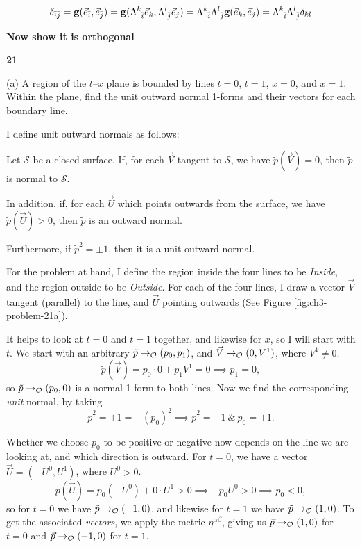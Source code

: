 \documentclass[gr-notes.tex]{subfiles}
\begin{document}
\begin{displaymath}
  \delta_{\bar{i}\bar{j}} =
  \vb{g}(\vec{e}_{\bar{i}}, \vec{e}_{\bar{j}}) =
  \vb{g}(\tensor{\Lambda}{^k_{\bar{i}}} \vec{e}_k,
         \tensor{\Lambda}{^l_{\bar{j}}} \vec{e}_j) =
  \tensor{\Lambda}{^k_{\bar{i}}}
  \tensor{\Lambda}{^l_{\bar{j}}}
  \vb{g}(\vec{e}_k, \vec{e}_j) =
  \tensor{\Lambda}{^k_{\bar{i}}}
  \tensor{\Lambda}{^l_{\bar{j}}}
  \delta_{kl}
\end{displaymath}

\textbf{Now show it is orthogonal}


\textbf{21}

(a) A region of the $t$--$x$ plane is bounded by lines $t=0$, $t=1$, $x=0$, and $x=1$. Within the plane, find the unit outward normal 1-forms and their vectors for each boundary line.

I define unit outward normals as follows:

Let $\mathcal{S}$ be a closed surface. If, for each $\vec{V}$ tangent to $\mathcal{S}$, we have $\tilde{p}(\vec{V}) = 0$, then $\tilde{p}$ is normal to $\mathcal{S}$.

In addition, if, for each $\vec{U}$ which points outwards from the surface, we have $\tilde{p}(\vec{U}) > 0$, then $\tilde{p}$ is an outward normal.

Furthermore, if $\tilde{p}^2 = \pm 1$, then it is a unit outward normal.

For the problem at hand, I define the region inside the four lines to be \emph{Inside}, and the region outside to be \emph{Outside}. For each of the four lines, I draw a vector $\vec{V}$ tangent (parallel) to the line, and $\vec{U}$ pointing outwards (See Figure \ref{fig:ch3-problem-21a}).

It helps to look at $t = 0$ and $t = 1$ together, and likewise for $x$, so I will start with $t$. We start with an arbitrary $\tilde{p} \to_{\mathcal{O}} (p_0, p_1)$, and $\vec{V} \to_{\mathcal{O}} (0, V^1)$, where $V^1 \neq 0$.
\begin{displaymath}
  \tilde{p}(\vec{V}) =
  p_0 \cdot 0 + p_1 V^1 = 0
  \implies
  p_1 = 0,
\end{displaymath}
so $\tilde{p} \to_{\mathcal{O}} (p_0, 0)$ is a normal 1-form to both lines. Now we find the corresponding \emph{unit} normal, by taking
\begin{displaymath}
  \tilde{p}^2 = \pm 1 = -(p_0)^2 \implies
  \tilde{p}^2 = -1 \ \& \ p_0 = \pm 1.
\end{displaymath}

Whether we choose $p_0$ to be positive or negative now depends on the line we are looking at, and which direction is outward. For $t = 0$, we have a vector $\vec{U} = (-U^0, U^1)$, where $U^0 > 0$.
\begin{displaymath}
  \tilde{p}(\vec{U}) =
  p_0 (-U^0) + 0 \cdot U^1 > 0
  \implies
  -p_0 U^0 > 0
  \implies
  p_0 < 0,
\end{displaymath}
so for $t = 0$ we have $\tilde{p} \to_{\mathcal{O}} (-1, 0)$, and likewise for $t = 1$ we have $\tilde{p} \to_{\mathcal{O}} (1, 0)$. To get the associated \emph{vectors}, we apply the metric $\eta^{\alpha\beta}$, giving us $\vec{p} \to_{\mathcal{O}} (1, 0)$ for $t = 0$ and $\vec{p} \to_{\mathcal{O}} (-1, 0)$ for $t = 1$.
\end{document}
